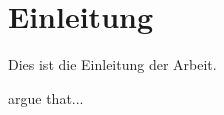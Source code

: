 \section{Einleitung}

Dies ist die Einleitung der Arbeit.

\textcite{blome-dreesEinleitung2023} argue that...
